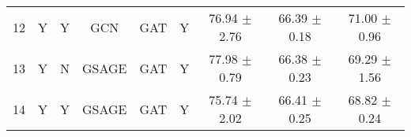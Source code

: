 \begin{table}[!htbp]
\begin{sc}
{\begin{tabular}{cccccc|ccc}
12 & Y & Y & \cellcolor[HTML]{D0E0E3}GCN & \cellcolor[HTML]{D9EAD3}GAT & Y & 76.94 $\pm$ 2.76 & 66.39 $\pm$ 0.18 & 71.00 $\pm$ 0.96 \\
13 & Y & N & \cellcolor[HTML]{CFE2F3}GSAGE & \cellcolor[HTML]{D9EAD3}GAT & Y & 77.98 $\pm$ 0.79 & 66.38 $\pm$ 0.23 & 69.29 $\pm$ 1.56 \\
14 & Y & Y & \cellcolor[HTML]{CFE2F3}GSAGE & \cellcolor[HTML]{D9EAD3}GAT & Y & 75.74 $\pm$ 2.02 & 66.41 $\pm$ 0.25 & 68.82 $\pm$ 0.24\\\bottomrule
\end{tabular}
}
\end{sc}
\end{table}
